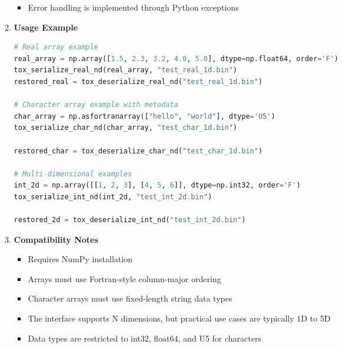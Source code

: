 \documentclass[11pt]{article}
\begin{document}
\begin{enumerate}
\begin{enumerate}
\begin{itemize}
	      	      	\item Error handling is implemented through Python exceptions
	      	      \end{itemize}
	      	      
	      	\item \textbf{Usage Example}
	      	      
	      	      \begin{lstlisting}[language=Python, caption={Full example of serialization and deserialization}]
# Real array example
real_array = np.array([1.5, 2.3, 3.2, 4.0, 5.0], dtype=np.float64, order='F')
tox_serialize_real_nd(real_array, "test_real_1d.bin")
restored_real = tox_deserialize_real_nd("test_real_1d.bin")

# Character array example with metadata
char_array = np.asfortranarray(["hello", "world"], dtype='U5')
tox_serialize_char_nd(char_array, "test_char_1d.bin")

restored_char = tox_deserialize_char_nd("test_char_1d.bin")

# Multi-dimensional examples
int_2d = np.array([[1, 2, 3], [4, 5, 6]], dtype=np.int32, order='F')
tox_serialize_int_nd(int_2d, "test_int_2d.bin")

restored_2d = tox_deserialize_int_nd("test_int_2d.bin")
	      	      \end{lstlisting}
	      	      
	      	\item \textbf{Compatibility Notes}
	      	      
	      	      \begin{itemize}
	      	      	\item Requires NumPy installation
	      	      	      
	      	      	\item Arrays must use Fortran-style column-major ordering
	      	      	      
	      	      	\item Character arrays must use fixed-length string data types
	      	      	      
	      	      	\item The interface supports N dimensions, but practical use cases
	      	      	      are typically 1D to 5D
	      	      	      
	      	      	\item Data types are restricted to int32, float64, and U5 for characters
	      	      \end{itemize}
	      \end{enumerate}
	      

\end{enumerate}
\end{document}
